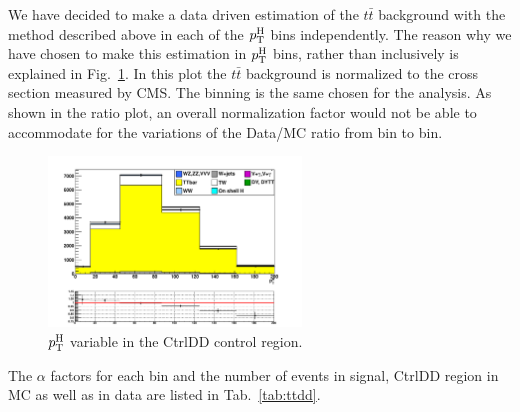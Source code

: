 We have decided to make a data driven estimation of the $t\bar{t}$ background with the method described above in each of the $p_\mathrm{T}^\mathrm{H}$ bins independently. The reason why we have chosen to make this estimation in $p_\mathrm{T}^\mathrm{H}$ bins, rather than inclusively is explained in Fig.~\ref{fig:ttpth}. In this plot the $t\bar{t}$ background is normalized to the cross section measured by CMS. The binning is the same chosen for the analysis. As shown in the ratio plot, an overall normalization factor would not be able to accommodate for the variations of the Data/MC ratio from bin to bin.
\begin{figure}[b]
\centering
\includegraphics[width=0.6\textwidth]{images/ttpth.pdf}
\caption{$p_\mathrm{T}^\mathrm{H}$ variable in the CtrlDD control region.\label{fig:ttpth}}
\end{figure}

The $\alpha$ factors for each bin and the number of events in signal, CtrlDD region in MC as well as in data are listed in Tab.~\ref{tab:ttdd}.






